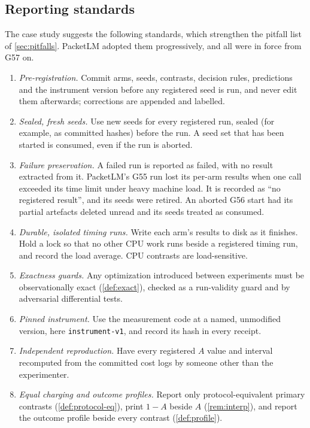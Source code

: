 \documentclass[11pt]{article}
\theoremstyle{remark}
\begin{document}
\subsection{Reporting standards}\label{sec:standards}
The case study suggests the following standards, which strengthen the pitfall list of \cref{sec:pitfalls}. PacketLM adopted them progressively, and all were in force from G57 on.
\begin{enumerate}[label=S\arabic*.,leftmargin=*,itemsep=1pt]
\item \emph{Pre-registration.} Commit arms, seeds, contrasts, decision rules, predictions and the instrument version before any registered seed is run, and never edit them afterwards; corrections are appended and labelled.
\item \emph{Sealed, fresh seeds.} Use new seeds for every registered run, sealed (for example, as committed hashes) before the run. A seed set that has been started is consumed, even if the run is aborted.
\item \emph{Failure preservation.} A failed run is reported as failed, with no result extracted from it. PacketLM's G55 run lost its per-arm results when one call exceeded its time limit under heavy machine load. It is recorded as ``no registered result'', and its seeds were retired. An aborted G56 start had its partial artefacts deleted unread and its seeds treated as consumed.
\item \emph{Durable, isolated timing runs.} Write each arm's results to disk as it finishes. Hold a lock so that no other CPU work runs beside a registered timing run, and record the load average. CPU contrasts are load-sensitive.
\item \emph{Exactness guards.} Any optimization introduced between experiments must be observationally exact (\cref{def:exact}), checked as a run-validity guard and by adversarial differential tests.
\item \emph{Pinned instrument.} Use the measurement code at a named, unmodified version, here \texttt{instrument-v1}, and record its hash in every receipt.
\item \emph{Independent reproduction.} Have every registered $A$ value and interval recomputed from the committed cost logs by someone other than the experimenter.
\item \emph{Equal charging and outcome profiles.} Report only protocol-equivalent primary contrasts (\cref{def:protocol-eq}), print $1-A$ beside $A$ (\cref{rem:interp}), and report the outcome profile beside every contrast (\cref{def:profile}).
\end{enumerate}
\end{document}
